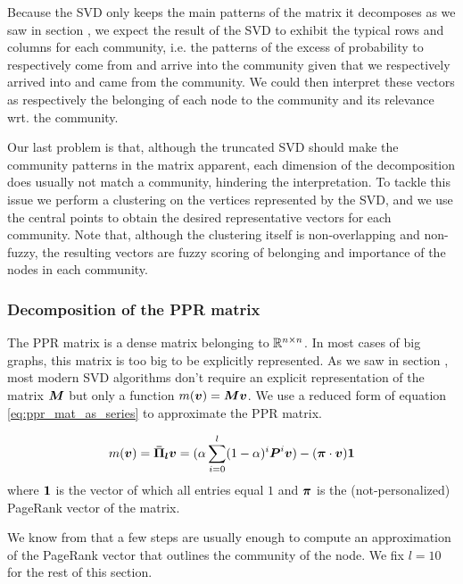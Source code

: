 Because the SVD only keeps the main patterns of the matrix it decomposes as we saw in section , we expect the result of the SVD to exhibit the typical rows and columns for each community, i.e. the patterns of the excess of probability to respectively come from and arrive into the community given that we respectively arrived into and came from the community.
We could then interpret these vectors as respectively the belonging of each node to the community and its relevance wrt. the community.

Our last problem is that, although the truncated SVD should make the community patterns in the matrix apparent, each dimension of the decomposition does usually not match a community, hindering the interpretation. To tackle this issue we perform a clustering on the vertices represented by the SVD, and we use the central points to obtain the desired representative vectors for each community. Note that, although the clustering itself is non-overlapping and non-fuzzy, the resulting vectors are fuzzy scoring of belonging and importance of the nodes in each community.

\subsubsection{Decomposition of the PPR matrix}
The PPR matrix is a dense matrix belonging to $\mathbb{R}^{n\times n}$. In most cases of big graphs, this matrix is too big to be explicitly represented. As we saw in section , most modern SVD algorithms don't require an explicit representation of the matrix $\boldsymbol{M}$ but only a function $m(\boldsymbol{v}) = \boldsymbol{M}\boldsymbol{v}$. We use a reduced form of equation \eqref{eq:ppr_mat_as_series} to approximate the PPR matrix.

\begin{equation}
    m(\boldsymbol{v}) = \boldsymbol{\Bar{\Pi}_l}\boldsymbol{v} = (\alpha \sum_{i=0}^l (1-\alpha)^i\boldsymbol{P}^i\boldsymbol{v}) - (\boldsymbol{\pi} \cdot \boldsymbol{v}) \boldsymbol{1}
\end{equation}
\noindent where $\boldsymbol{1}$ is the vector of which all entries equal $1$ and $\boldsymbol{\pi}$ is the (not-personalized) PageRank vector of the matrix.

We know from \cite{Kloumann2014} that a few steps are usually enough to compute an approximation of the PageRank vector that outlines the community of the node. We fix $l=10$ for the rest of this section.

